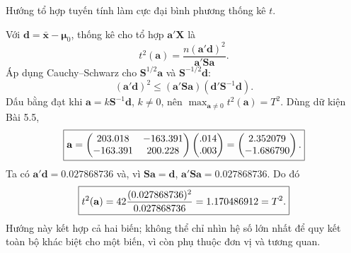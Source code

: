\begin{problem}[Bài 5.8.]
Hướng tổ hợp tuyến tính làm cực đại bình phương thống kê $t$.
\end{problem}
\begin{solution}
Với $\mathbf d=\bar{\mathbf x}-\boldsymbol\mu_0$, thống kê cho tổ hợp
$\mathbf a'\mathbf X$ là
\[
t^2(\mathbf a)=\frac{n(\mathbf a'\mathbf d)^2}{\mathbf a'\mathbf S\mathbf a}.
\]
Áp dụng Cauchy--Schwarz cho $\mathbf S^{1/2}\mathbf a$ và
$\mathbf S^{-1/2}\mathbf d$:
\[
(\mathbf a'\mathbf d)^2\le(\mathbf a'\mathbf S\mathbf a)
(\mathbf d'\mathbf S^{-1}\mathbf d).
\]
Dấu bằng đạt khi $\mathbf a=k\mathbf S^{-1}\mathbf d$, $k\ne0$, nên
$\max_{\mathbf a\ne0}t^2(\mathbf a)=T^2$.
Dùng dữ kiện Bài 5.5,
\[
\boxed{\mathbf a=\begin{pmatrix}203.018&-163.391\\-163.391&200.228\end{pmatrix}
\begin{pmatrix}.014\\.003\end{pmatrix}
=\begin{pmatrix}2.352079\\-1.686790\end{pmatrix}.}
\]
Ta có $\mathbf a'\mathbf d=0.027868736$ và, vì $\mathbf S\mathbf a=\mathbf d$,
$\mathbf a'\mathbf S\mathbf a=0.027868736$. Do đó
\[
\boxed{t^2(\mathbf a)=42\frac{(0.027868736)^2}{0.027868736}
=1.170486912=T^2.}
\]
Hướng này kết hợp cả hai biến; không thể chỉ nhìn hệ số lớn nhất để quy
kết toàn bộ khác biệt cho một biến, vì còn phụ thuộc đơn vị và tương quan.
\end{solution}

